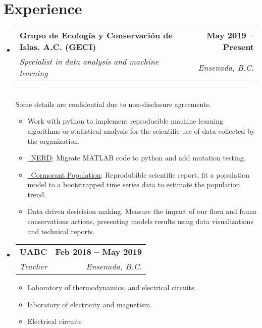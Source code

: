 \documentclass[letterpaper,11pt]{article}
\makeatletter
\newcommand{\resumeItem}[1]{
  \item\small{
    {#1 \vspace{-2pt}}
  }
}
\newcommand{\resumeSubheading}[4]{
  \vspace{-2pt}\item
    \begin{tabular*}{1.0\textwidth}[t]{l@{\extracolsep{\fill}}r}
      \textbf{#1} & \textbf{\small #2} \\
      \textit{\small#3} & \textit{\small #4} \\
    \end{tabular*}\vspace{-7pt}
}
\newcommand{\resumeSubHeadingListStart}{\begin{itemize}[leftmargin=0.0in, label={}]}
\newcommand{\resumeSubHeadingListEnd}{\end{itemize}}
\newcommand{\resumeItemListStart}{\begin{itemize}}
\newcommand{\resumeItemListEnd}{\end{itemize}\vspace{-5pt}}
\makeatother
\begin{document}
\section{Experience}
  \resumeSubHeadingListStart

    \resumeSubheading
      {Grupo de Ecología y Conservación de Islas. A.C. (GECI)}{May 2019 -- Present}
      {Specialist in data analysis and machine learning}{Ensenada, B.C.}\\ \vspace{7pt}
      \small Some details are confidential due to non-disclosure agreements.
      \resumeItemListStart
        \resumeItem{Work with python to implement reproducible machine learning algorithms or statistical analysis for the scientific use of data collected by the organization.}
        \resumeItem{\href{https://github.com/IslasGECI/nerd}{\raisebox{-0.2\height}\faGithub\ \underline{NERD}}: Migrate MATLAB code to python and add mutation testing.}
        \resumeItem{\href{https://github.com/IslasGECI/cormorant_population_growth}{\raisebox{-0.2\height}\faGithub\ \underline{Cormorant Population}}: Reprodubible scientific report, fit a population model to a bootstrapped time series data to estimate the population trend.}
        \resumeItem{Data driven desicision making. Measure the impact of our flora and fauna conservations actions, presenting models results using data visualizations and technical reports.}

      \resumeItemListEnd

    \resumeSubheading
      {UABC}{Feb 2018 -- May 2019}
      {Teacher}{Ensenada, B.C.} \vspace{3pt}
      \resumeItemListStart Courses:
        \resumeItem{Laboratory of thermodynamics,  and electrical circuits.}
        \resumeItem{laboratory of electricity and magnetism.}
        \resumeItem{Electrical circuits}
    \resumeItemListEnd
    
  \resumeSubHeadingListEnd
\vspace{-16pt}

\end{document}
